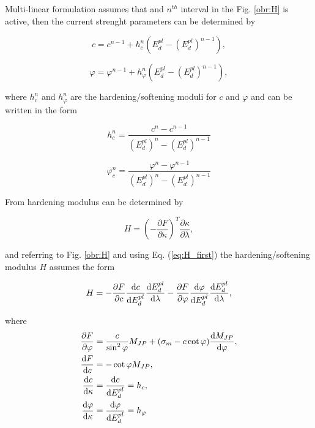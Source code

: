 Multi-linear formulation assumes that and $n^{th}$ interval in the Fig. \ref{obr:H} is active, then the current strenght parameters can be determined by

\begin{equation}\label{eq:c}
	c = c^{n-1} + h_c^n \left( E_d^{pl} -(E_d^{pl})^{n-1} \right),
\end{equation}

\begin{equation}\label{eq:phi}
\varphi = \varphi^{n-1} + h_\varphi^n\left( E_d^{pl} - (E_d^{pl})^{n-1} \right),
\end{equation}

where $h_c^n$ and $h_\varphi^n$ are the hardening/softening moduli for $c$ and $\varphi$ and can be written in the form


\begin{equation}\label{eq:h_c}
	h_c^n = \dfrac{c^n-c^{n-1}}{(E_d^{pl})^{n}-(E_d^{pl})^{n-1}}
\end{equation}

\begin{equation}\label{eq:h_phi}
 	\varphi_c^n = \dfrac{\varphi^n-\varphi^{n-1}}{(E_d^{pl})^{n}-(E_d^{pl})^{n-1}}
\end{equation}

From \cite{geofem} hardening modulus can be determined by

\begin{equation}\label{eq:H_first}
	H = \left(-\dfrac{\partial F}{\partial \kappa}\right)^T \dfrac{\partial \kappa}{\partial \lambda},
\end{equation}


and referring to Fig. \ref{obr:H} and using Eq. (\ref{eq:H_first}) the hardening/softening modulus $H$ assumes the form 

\begin{equation}\label{eq:H}
	H = - \pdv{F}{c} \dv{c}{E_d^{pl}} \dv{E_d^{pl}}{\lambda} - \pdv{F}{\varphi} \dv{\varphi}{E_d^{pl}} \dv{E_d^{pl}}{\lambda},
\end{equation}

where
\begin{align}
\pdv{F}{\varphi}& = \dfrac{c}{\sin^2\varphi} M_{JP} + (\sigma_m - c\cot \varphi) \dv{M_{JP}}{\varphi},\label{eq:F/phi}\\
\dv{F}{c}& = - \cot \varphi M_{JP},\\
\dv{c}{\kappa}& = \dv{c}{E_d^{pl}} = h_c,\\
\dv{\varphi}{\kappa}& = \dv{\varphi}{E_d^{pl}} = h_\varphi
\end{align}

